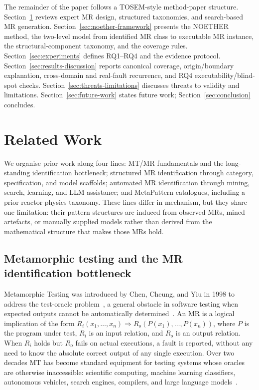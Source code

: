 \documentclass[manuscript]{acmart}
\begin{document}
The remainder of the paper follows a TOSEM-style method-paper structure. Section~\ref{sec:related} reviews expert MR design, structured taxonomies, and search-based MR generation. Section~\ref{sec:noether-framework} presents the NOETHER method, the two-level model from identified MR class to executable MR instance, the structural-component taxonomy, and the coverage rules. Section~\ref{sec:experiments} defines RQ1--RQ4 and the evidence protocol. Section~\ref{sec:results-discussion} reports canonical coverage, origin/boundary explanation, cross-domain and real-fault recurrence, and RQ4 executability/blind-spot checks. Section~\ref{sec:threats-limitations} discusses threats to validity and limitations. Section~\ref{sec:future-work} states future work; Section~\ref{sec:conclusion} concludes.

\section{Related Work}
\label{sec:related}

We organise prior work along four lines: MT/MR fundamentals and the long-standing identification bottleneck; structured MR identification through category, specification, and model scaffolds; automated MR identification through mining, search, learning, and LLM assistance; and MetaPattern catalogues, including a prior reactor-physics taxonomy. These lines differ in mechanism, but they share one limitation: their pattern structures are induced from observed MRs, mined artefacts, or manually supplied models rather than derived from the mathematical structure that makes those MRs hold.

\subsection{Metamorphic testing and the MR identification bottleneck}

Metamorphic Testing was introduced by Chen, Cheung, and Yiu in 1998 to address the test-oracle problem~\cite{Chen1998}, a general obstacle in software testing when expected outputs cannot be automatically determined~\cite{Barr2015OracleProblem}. An MR is a logical implication of the form $R_i(x_1,\dots,x_n) \Rightarrow R_o(P(x_1),\dots,P(x_n))$, where $P$ is the program under test, $R_i$ is an input relation, and $R_o$ is an output relation. When $R_i$ holds but $R_o$ fails on actual executions, a fault is reported, without any need to know the absolute correct output of any single execution. Over two decades MT has become standard equipment for testing systems whose oracles are otherwise inaccessible: scientific computing, machine learning classifiers, autonomous vehicles, search engines, compilers, and large language models~\cite{Segura2016, LiTOSEM2025}.
\end{document}
